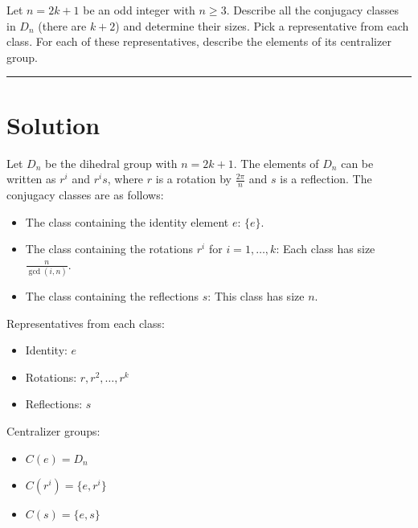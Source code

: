 \documentclass[12pt]{amsart}
\theoremstyle{definition}
\numberwithin{equation}{section}
\begin{document}
\begin{exercise}{5} Let \(n=2k+1\) be an odd integer with \(n \geq 3\). Describe all the conjugacy classes in \(D_n\) (there are \(k+2\)) and determine their sizes. Pick a representative from each class. For each of these representatives, describe the elements of its centralizer group.

    \noindent\rule{\linewidth}{1pt}

    \section*{Solution}
    
    Let \(D_n\) be the dihedral group with \(n = 2k+1\). The elements of \(D_n\) can be written as \(r^i\) and \(r^is\), where \(r\) is a rotation by \(\frac{2\pi}{n}\) and \(s\) is a reflection. The conjugacy classes are as follows:
    
    \begin{itemize}
        \item The class containing the identity element \(e\): \(\{e\}\).
        \item The class containing the rotations \(r^i\) for \(i=1, \ldots, k\): Each class has size \(\frac{n}{\gcd(i,n)}\).
        \item The class containing the reflections \(s\): This class has size \(n\).
    \end{itemize}
    
    Representatives from each class:
    \begin{itemize}
        \item Identity: \(e\)
        \item Rotations: \(r, r^2, \ldots, r^k\)
        \item Reflections: \(s\)
    \end{itemize}
    
    Centralizer groups:
    \begin{itemize}
        \item \(C(e) = D_n\)
        \item \(C(r^i) = \{e, r^i\}\)
        \item \(C(s) = \{e, s\}\)
    \end{itemize}
\end{exercise}
\newpage
\end{document}

